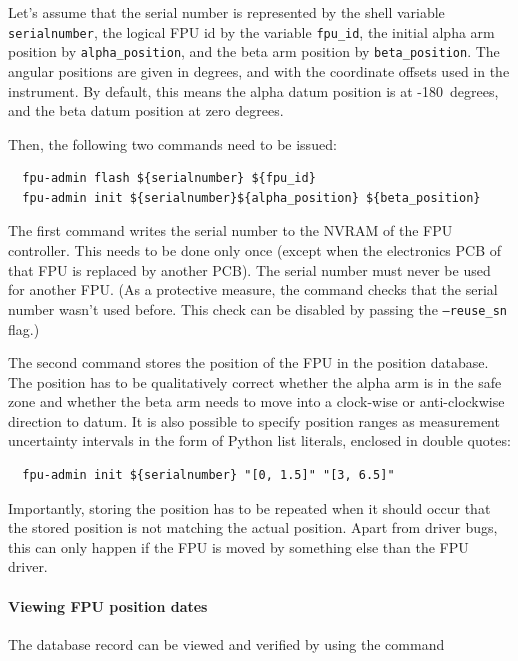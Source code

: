 \documentclass[11pt,a4paper]{scrartcl}
\begin{document}
Let's assume that the serial number is represented by the shell
variable \texttt{serialnumber}, the logical FPU id by the variable
\texttt{fpu\_id}, the initial alpha arm position by
\texttt{alpha\_position}, and the beta arm position by
\texttt{beta\_position}. The angular positions are given in degrees,
and with the coordinate offsets used in the instrument. By default,
this means the alpha datum position is at -180\degree\ degrees, and the beta
datum position at zero degrees.

Then, the following two commands need to be issued:

\begin{verbatim}
  fpu-admin flash ${serialnumber} ${fpu_id}
  fpu-admin init ${serialnumber}${alpha_position} ${beta_position}
\end{verbatim}

The first command writes the serial number to the NVRAM of the FPU
controller. This needs to be done only once (except when the
electronics PCB of that FPU is replaced by another PCB). The serial
number must never be used for another FPU. (As a protective measure,
the command checks that the serial number wasn't used before. This
check can be disabled by passing the \texttt{--reuse\_sn} flag.)

The second command stores the position of the FPU in the position
database. The position has to be qualitatively correct whether the
alpha arm is in the safe zone and whether the beta arm needs to move
into a clock-wise or anti-clockwise direction to datum. It is also
possible to specify position ranges as measurement uncertainty
intervals in the form of Python list literals, enclosed in double
quotes:
\begin{verbatim}
  fpu-admin init ${serialnumber} "[0, 1.5]" "[3, 6.5]"
\end{verbatim}


Importantly, storing the position has to be repeated when it should
occur that the stored position is not matching the actual
position. Apart from driver bugs, this can only happen if the FPU is
moved by something else than the FPU driver.

\paragraph{Viewing FPU position dates}

The database record can be viewed and verified by using the command
\end{document}
